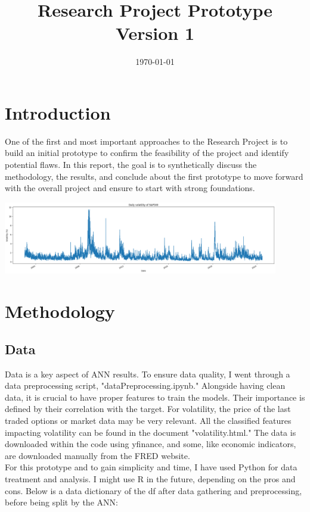 \documentclass[letterpaper,11pt]{article}
\title{\textbf{Research Project Prototype\\Version 1}}
\author{}
\date{\today}
\begin{document}
\maketitle
\hrulefill
\tableofcontents
\vfill

\section{Introduction}
One of the first and most important approaches to the Research Project is to build an initial prototype to confirm the feasibility of the project and identify potential flaws. In this report, the goal is to synthetically discuss the methodology, the results, and conclude about the first prototype to move forward with the overall project and ensure to start with strong foundations.
\begin{center}
\includegraphics[width=0.9\textwidth]{img/vol500.png}
\end{center}
\newpage

\section{Methodology}

\subsection{Data}

Data is a key aspect of ANN results. To ensure data quality, I went through a data preprocessing script, "dataPreprocessing.ipynb." Alongside having clean data, it is crucial to have proper features to train the models. Their importance is defined by their correlation with the target. For volatility, the price of the last traded options or market data may be very relevant. All the classified features impacting volatility can be found in the document "volatility.html."  
The data is downloaded within the code using yfinance, and some, like economic indicators, are downloaded manually from the FRED website.\\
For this prototype and to gain simplicity and time, I have used Python for data treatment and analysis. I might use R in the future, depending on the pros and cons.  
Below is a data dictionary of the df after data gathering and preprocessing, before being split by the ANN:
\end{document}
